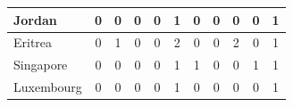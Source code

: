 \documentclass[12pt]{article}  %
\begin{document}
\begin{subappendices}
\begin{longtable}{|l|c|c|c|c|c|c|c|c|c|c|}
	\hline
	Jordan                                                         & 0                                                                      & 0                                                                      & 0                                                                      & 0                                                                      & 1                                                                      & 0                                                                      & 0                         & 0                           & 0                           & 1                           \\ 
	\hline
	Eritrea                                                        & 0                                                                      & 1                                                                      & 0                                                                      & 0                                                                      & 2                                                                      & 0                                                                      & 0                         & 2                           & 0                           & 1                           \\ 
	\hline
	Singapore                                                      & 0                                                                      & 0                                                                      & 0                                                                      & 0                                                                      & 1                                                                      & 1                                                                      & 0                         & 0                           & 1                           & 1                           \\ 
	\hline
	Luxembourg                                                     & 0                                                                      & 0                                                                      & 0                                                                      & 0                                                                      & 1                                                                      & 0                                                                      & 0                         & 0                           & 0                           & 1                           \\ 

\end{longtable}
\end{subappendices}
\end{document}
